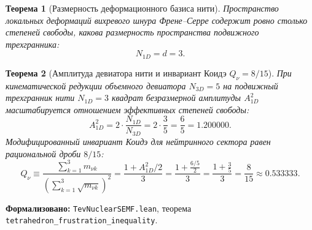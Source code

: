 \documentclass[11pt,a4paper]{article}
\newtheorem{theorem}{Теорема}
\theoremstyle{definition}
\theoremstyle{remark}
\begin{document}
\begin{theorem}[Размерность деформационного базиса нити]
\label{thm:frenet_basis_dim}
Пространство локальных деформаций вихревого шнура Френе--Серре содержит ровно столько степеней свободы, какова размерность пространства подвижного трехгранника:
\begin{equation}
	N_{1D} = d = 3.
\label{eq:frenet_dim_three}
\end{equation}
\end{theorem}
	
\begin{theorem}[Амплитуда девиатора нити и инвариант Коидэ $Q_\nu = 8/15$]
\label{thm:neutrino_koide_derivation}
При кинематической редукции объемного девиатора $N_{3D} = 5$ на подвижный трехгранник нити $N_{1D} = 3$ квадрат безразмерной амплитуды $A_{1D}^2$ масштабируется отношением эффективных степеней свободы:
\begin{equation}
	A_{1D}^2 = 2 \cdot \frac{N_{1D}}{N_{3D}} = 2 \cdot \frac{3}{5} = \frac{6}{5} = 1.200000.
\label{eq:amplitude_1D_exact}
\end{equation}
Модифицированный инвариант Коидэ для нейтринного сектора равен рациональной дроби $8/15$:
\begin{equation}
	Q_\nu \equiv \frac{\sum_{k=1}^3 m_{\nu k}}{\left(\sum_{k=1}^3 \sqrt{m_{\nu k}}\right)^2} = \frac{1 + A_{1D}^2 / 2}{3} = \frac{1 + \frac{6/5}{2}}{3} = \frac{1 + \frac{3}{5}}{3} = \frac{8}{15} \approx 0.533333.
	\label{eq:neutrino_koide_exact}
\end{equation}
\end{theorem}

\noindent\small\textbf{Формализовано:} \texttt{TevNuclearSEMF.lean}, теорема \texttt{tetrahedron_frustration_inequality}.
	
\end{document}
